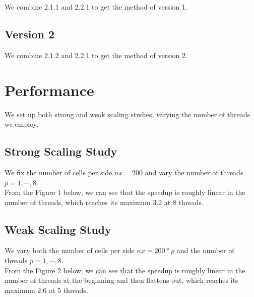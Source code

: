 \documentclass[12pt]{article}
\numberwithin{equation}{section}
\begin{document}
We combine 2.1.1 and 2.2.1 to get the method of version 1.

\subsection{Version 2}

We combine 2.1.2 and 2.2.1 to get the method of version 2.





\section{Performance}

We set up both strong and weak scaling studies, varying the number of threads we employ.

\subsection{Strong Scaling Study}

We fix the number of cells per side $nx = 200$ and vary the number of threads $p = 1, \cdots, 8$.
\\
From the Figure 1 below, we can see that the speedup is roughly linear in the number of threads, which reaches its maximum 3.2 at 8 threads.


\subsection{Weak Scaling Study}

We vary both the number of cells per side $nx = 200 * p$ and the number of threads $p = 1, \cdots, 8$.
\\
From the Figure 2 below, we can see that the speedup is roughly linear in the number of threads at the beginning and then flattens out, which reaches its maximum 2.6 at 5 threads.
\end{document}
